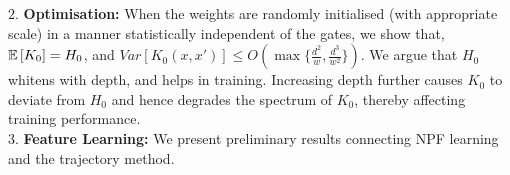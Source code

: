 $2.$ \textbf{Optimisation:}  When the weights are randomly initialised (with appropriate scale) in a manner statistically independent of the gates, we show that, $\mathbb{E}\left[K_0\right]=H_0$, and $Var\left[K_0(x,x')\right]\leq O(\max\{\frac{d^2}{w}, \frac{d^3}{w^2}\})$. We argue that   $H_0$ whitens with depth, and helps in training. Increasing depth further causes $K_0$ to deviate from $H_0$ and hence degrades the spectrum of $K_0$, thereby affecting training performance.\\
$3.$ \textbf{Feature Learning:} We present preliminary results connecting NPF learning and the trajectory method.

\begin{comment}
Understanding optimisation and generalisation of deep neural networks (DNNs) trained using first-order method such as (stochastic) gradient descent is an important problem in machine learning. In this paper, we throw light on the following two questions:\hfill\\
\textbf{Question I (Optimisation):} \emph{What is the role of width and depth in training of DNNs? Why increasing depth till a point helps in training? Why increasing the depth beyond hurts training?}\\
\textbf{Question II (Generalisation):} \emph{What are the hidden features in a DNN? Are these features learned? and if so, how?} \hfill\\


\end{comment}
